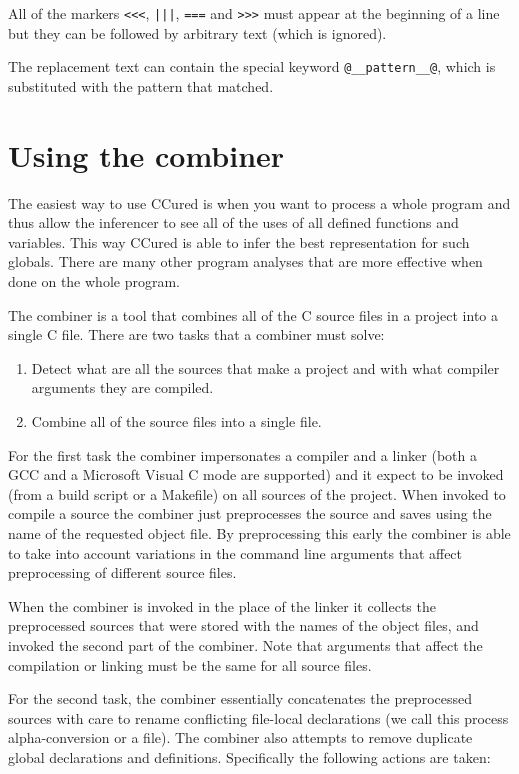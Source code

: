 \documentclass{book}
\def\t#1{{\tt #1}}
\begin{document}
 All of the markers \t{<<<}, \t{|||}, \t{===} and \t{>>>} must appear at the
beginning of a line but they can be followed by arbitrary text (which is
ignored).

 The replacement text can contain the special keyword \t{@\_\_pattern\_\_@},
which is substituted with the pattern that matched. 

  \chapter{Using the combiner}\label{ch-combiner}

 The easiest way to use CCured is when you want to process a whole program and
thus allow the inferencer to see all of the uses of all defined functions and
variables. This way CCured is able to infer the best representation for such
globals. There are many other program analyses that are more effective when
done on the whole program.

 The combiner is a tool that combines all of the C source files in a project
into a single C file. There are two tasks that a combiner must solve:
\begin{enumerate}
\item Detect what are all the sources that make a project and with what
compiler arguments they are compiled.

\item Combine all of the source files into a single file. 
\end{enumerate}

 For the first task the combiner impersonates a compiler and a linker (both a
GCC and a Microsoft Visual C mode are supported) and it expect to be invoked
(from a build script or a Makefile) on all sources of the project. When
invoked to compile a source the combiner just preprocesses the source and
saves using the name of the requested object file. By preprocessing this early
the combiner is able to take into account variations in the command line
arguments that affect preprocessing of different source files. 

 When the combiner is invoked in the place of the linker it collects the
preprocessed sources that were stored with the names of the object files, and
invoked the second part of the combiner. Note that arguments that affect the
compilation or linking must be the same for all source files.

 For the second task, the combiner essentially concatenates the preprocessed
sources with care to rename conflicting file-local declarations (we call this
process alpha-conversion or a file). The combiner also attempts to remove
duplicate global declarations and definitions. Specifically the following
actions are taken: 
\end{document}

